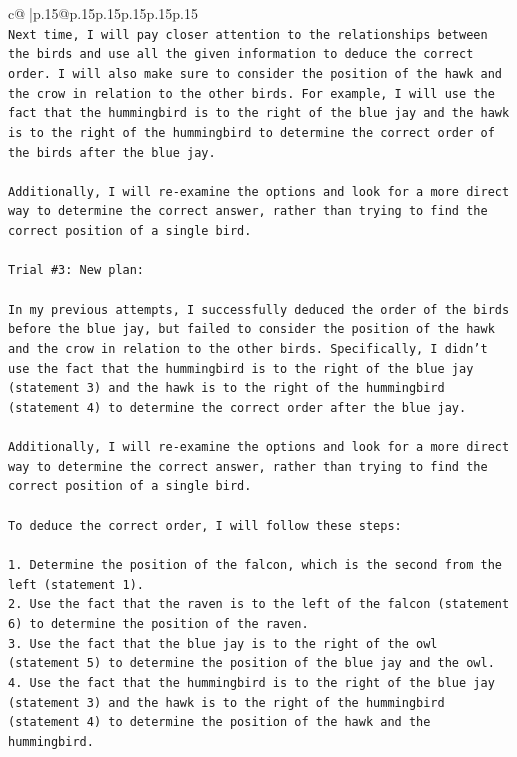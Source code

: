 \documentclass{article}
\begin{document}
{\begin{supertabular}{c@{$\;$}|p{.15\linewidth}@{}p{.15\linewidth}p{.15\linewidth}p{.15\linewidth}p{.15\linewidth}p{.15\linewidth}}
{{{\\ 
\texttt{Next time, I will pay closer attention to the relationships between the birds and use all the given information to deduce the correct order. I will also make sure to consider the position of the hawk and the crow in relation to the other birds. For example, I will use the fact that the hummingbird is to the right of the blue jay and the hawk is to the right of the hummingbird to determine the correct order of the birds after the blue jay.} \\
\\ 
\texttt{Additionally, I will re{-}examine the options and look for a more direct way to determine the correct answer, rather than trying to find the correct position of a single bird.} \\
\\ 
\texttt{Trial \#3: New plan: } \\
\\ 
\texttt{In my previous attempts, I successfully deduced the order of the birds before the blue jay, but failed to consider the position of the hawk and the crow in relation to the other birds. Specifically, I didn't use the fact that the hummingbird is to the right of the blue jay (statement 3) and the hawk is to the right of the hummingbird (statement 4) to determine the correct order after the blue jay.} \\
\\ 
\texttt{Additionally, I will re{-}examine the options and look for a more direct way to determine the correct answer, rather than trying to find the correct position of a single bird.} \\
\\ 
\texttt{To deduce the correct order, I will follow these steps:} \\
\\ 
\texttt{1. Determine the position of the falcon, which is the second from the left (statement 1).} \\
\texttt{2. Use the fact that the raven is to the left of the falcon (statement 6) to determine the position of the raven.} \\
\texttt{3. Use the fact that the blue jay is to the right of the owl (statement 5) to determine the position of the blue jay and the owl.} \\
\texttt{4. Use the fact that the hummingbird is to the right of the blue jay (statement 3) and the hawk is to the right of the hummingbird (statement 4) to determine the position of the hawk and the hummingbird.} \\
}}}
\end{supertabular}}
\end{document}
